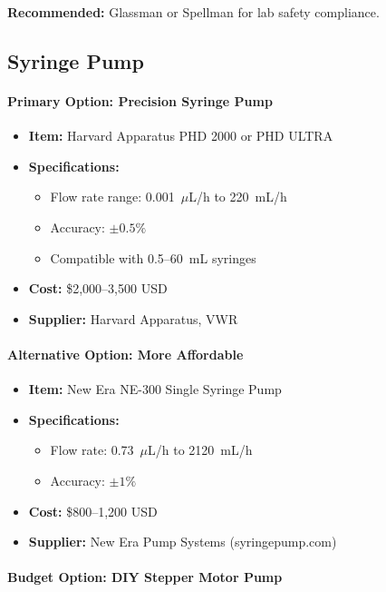 \documentclass[11pt]{article}
\begin{document}
\textbf{Recommended:} Glassman or Spellman for lab safety compliance.

\subsection{Syringe Pump}

\paragraph{Primary Option: Precision Syringe Pump}

\begin{itemize}
\item \textbf{Item:} Harvard Apparatus PHD 2000 or PHD ULTRA
\item \textbf{Specifications:}
  \begin{itemize}
  \item Flow rate range: 0.001~$\mu$L/h to 220~mL/h
  \item Accuracy: $\pm0.5\%$
  \item Compatible with 0.5--60~mL syringes
  \end{itemize}
\item \textbf{Cost:} \$2,000--3,500 USD
\item \textbf{Supplier:} Harvard Apparatus, VWR
\end{itemize}

\paragraph{Alternative Option: More Affordable}

\begin{itemize}
\item \textbf{Item:} New Era NE-300 Single Syringe Pump
\item \textbf{Specifications:}
  \begin{itemize}
  \item Flow rate: 0.73~$\mu$L/h to 2120~mL/h
  \item Accuracy: $\pm1\%$
  \end{itemize}
\item \textbf{Cost:} \$800--1,200 USD
\item \textbf{Supplier:} New Era Pump Systems (syringepump.com)
\end{itemize}

\paragraph{Budget Option: DIY Stepper Motor Pump}
\end{document}
